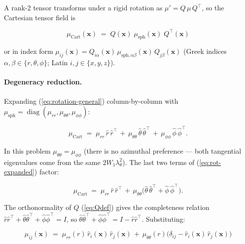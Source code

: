 \documentclass[11pt,letterpaper]{article}
\newcommand{\vect}[1]{\boldsymbol{#1}}
\begin{document}
A rank-2 tensor transforms under a rigid rotation as
$\mu' = Q\,\mu\,Q^{\!\top}$, so the Cartesian tensor field is

\begin{equation}
\boxed{\;
\mu_{\text{Cart}}(\vect x)
\;=\;
Q(\vect x)\;\mu_{\text{sph}}(\vect x)\;Q^{\!\top}(\vect x)
\;}
\label{eq:rotation-general}
\end{equation}

or in index form $\mu_{ij}(\vect x) = Q_{i\alpha}(\vect x)\,
\mu_{\text{sph},\alpha\beta}(\vect x)\,Q_{j\beta}(\vect x)$
(Greek indices $\alpha,\beta \in \{r,\theta,\phi\}$; Latin
$i,j\in\{x,y,z\}$).

\paragraph{Degeneracy reduction.}
Expanding (\ref{eq:rotation-general}) column-by-column with
$\mu_{\text{sph}} = \operatorname{diag}(\mu_{rr},\mu_{\theta\theta},
\mu_{\phi\phi})$:

\begin{equation}
\mu_{\text{Cart}}
\;=\;
\mu_{rr}\,\hat r\,\hat r^{\!\top}
\,+\,\mu_{\theta\theta}\,\hat\theta\,\hat\theta^{\!\top}
\,+\,\mu_{\phi\phi}\,\hat\phi\,\hat\phi^{\!\top}.
\label{eq:rot-expanded}
\end{equation}

In this problem $\mu_{\theta\theta} = \mu_{\phi\phi}$ (there is no
azimuthal preference — both tangential eigenvalues come from the
same $2 W_1 \lambda_\theta^{2}$). The last two terms of
(\ref{eq:rot-expanded}) factor:

\begin{equation}
\mu_{\text{Cart}}
\;=\;
\mu_{rr}\,\hat r\,\hat r^{\!\top}
\,+\,\mu_{\theta\theta}\bigl(\hat\theta\,\hat\theta^{\!\top}
                 + \hat\phi\,\hat\phi^{\!\top}\bigr).
\end{equation}

The orthonormality of $Q$ (\ref{eq:Qdef}) gives the completeness
relation
$\hat r\hat r^{\!\top} + \hat\theta\hat\theta^{\!\top}
+ \hat\phi\hat\phi^{\!\top} = I$, so
$\hat\theta\hat\theta^{\!\top} + \hat\phi\hat\phi^{\!\top}
= I - \hat r\hat r^{\!\top}$. Substituting:

\begin{equation}
\boxed{\;
\mu_{ij}(\vect x)
\;=\;
\mu_{rr}(r)\,\hat r_i(\vect x)\,\hat r_j(\vect x)
\,+\,\mu_{\theta\theta}(r)\bigl(\delta_{ij}
                              - \hat r_i(\vect x)\,\hat r_j(\vect x)\bigr)
\;}
\label{eq:rotation}
\end{equation}
\end{document}
